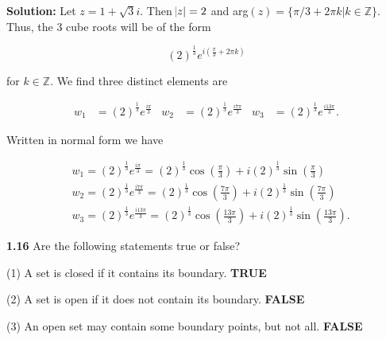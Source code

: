 \documentclass[12pt, a4paper]{article}
\begin{document}
\begin{description}
    \item\textbf{Solution: } Let $z=1+\sqrt{3}i$. Then $\abs{z}=2$ and arg$(z)=\{\pi/3+2\pi k|k\in\mathbb{Z}\}$. Thus, the 3 cube roots will be of the form 
    
    \begin{equation*}
        (2)^{\frac{1}{3}}e^{i(\frac{\pi}{3}+2\pi k)}
    \end{equation*}
    
    \item for $k\in\mathbb{Z}$. We find three distinct elements are
    
    \begin{align*}
        w_1 &= (2)^{\frac{1}{3}}e^{\frac{i\pi}{3}} & w_2 &= (2)^{\frac{1}{3}}e^{\frac{i7\pi}{3}} & w_3 &= (2)^{\frac{1}{3}}e^{\frac{i13\pi}{3}}.
    \end{align*}
    
    \item Written in normal form we have
    
    \begin{equation*}
        \begin{split}
            &w_1 = (2)^{\frac{1}{3}}e^{\frac{i\pi}{3}} = (2)^{\frac{1}{3}}\cos{(\frac{\pi}{3})}+i(2)^{\frac{1}{3}}\sin{(\frac{\pi}{3})} \\
            &w_2 = (2)^{\frac{1}{3}}e^{\frac{i7\pi}{3}} = (2)^{\frac{1}{3}}\cos{(\frac{7\pi}{3})}+i(2)^{\frac{1}{3}}\sin{(\frac{7\pi}{3})} \\
            &w_3 = (2)^{\frac{1}{3}}e^{\frac{i13\pi}{3}} = (2)^{\frac{1}{3}}\cos{(\frac{13\pi}{3})}+i(2)^{\frac{1}{3}}\sin{(\frac{13\pi}{3})}. 
        \end{split}
    \end{equation*}
\end{description}

\newpage

\noindent\textbf{1.16} Are the following statements true or false?

\begin{description}
    \item(1) A set is closed if it contains its boundary. \textbf{TRUE}
    \item(2) A set is open if it does not contain its boundary. \textbf{FALSE}
    \item(3) An open set may contain some boundary points, but not all. \textbf{FALSE}
\end{description}
\end{document}

